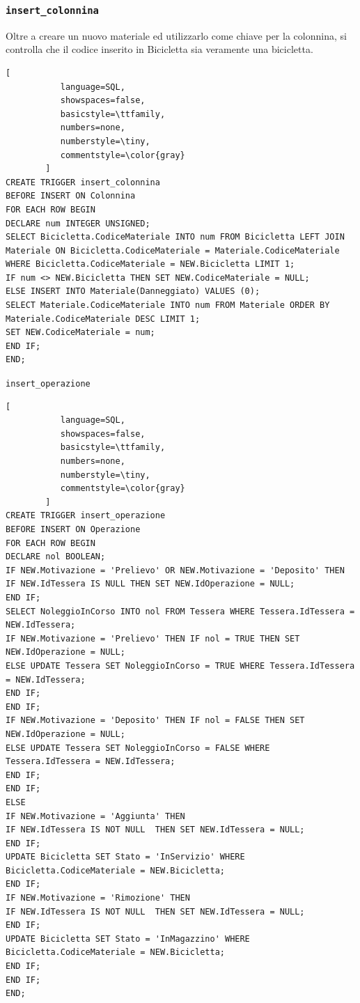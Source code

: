 \documentclass[a4paper,twoside]{article}
\begin{document}
\subsubsection{\texttt{insert\_colonnina}}
Oltre a creare un nuovo materiale ed utilizzarlo come chiave per la colonnina, si controlla che il codice inserito in Bicicletta sia veramente una bicicletta.%
\begin{lstlisting}[
           language=SQL,
           showspaces=false,
           basicstyle=\ttfamily,
           numbers=none,
           numberstyle=\tiny,
           commentstyle=\color{gray}
        ]
CREATE TRIGGER insert_colonnina
BEFORE INSERT ON Colonnina
FOR EACH ROW BEGIN
DECLARE num INTEGER UNSIGNED;
SELECT Bicicletta.CodiceMateriale INTO num FROM Bicicletta LEFT JOIN Materiale ON Bicicletta.CodiceMateriale = Materiale.CodiceMateriale WHERE Bicicletta.CodiceMateriale = NEW.Bicicletta LIMIT 1;
IF num <> NEW.Bicicletta THEN SET NEW.CodiceMateriale = NULL;
ELSE INSERT INTO Materiale(Danneggiato) VALUES (0);
SELECT Materiale.CodiceMateriale INTO num FROM Materiale ORDER BY Materiale.CodiceMateriale DESC LIMIT 1;
SET NEW.CodiceMateriale = num;
END IF;
END;
\end{lstlisting}
\texttt{insert\_operazione}
\begin{lstlisting}[
           language=SQL,
           showspaces=false,
           basicstyle=\ttfamily,
           numbers=none,
           numberstyle=\tiny,
           commentstyle=\color{gray}
        ]
CREATE TRIGGER insert_operazione
BEFORE INSERT ON Operazione
FOR EACH ROW BEGIN
DECLARE nol BOOLEAN;
IF NEW.Motivazione = 'Prelievo' OR NEW.Motivazione = 'Deposito' THEN
IF NEW.IdTessera IS NULL THEN SET NEW.IdOperazione = NULL;
END IF;
SELECT NoleggioInCorso INTO nol FROM Tessera WHERE Tessera.IdTessera = NEW.IdTessera;
IF NEW.Motivazione = 'Prelievo' THEN IF nol = TRUE THEN SET NEW.IdOperazione = NULL;
ELSE UPDATE Tessera SET NoleggioInCorso = TRUE WHERE Tessera.IdTessera = NEW.IdTessera;
END IF;
END IF;
IF NEW.Motivazione = 'Deposito' THEN IF nol = FALSE THEN SET NEW.IdOperazione = NULL;
ELSE UPDATE Tessera SET NoleggioInCorso = FALSE WHERE Tessera.IdTessera = NEW.IdTessera;
END IF;
END IF;
ELSE
IF NEW.Motivazione = 'Aggiunta' THEN
IF NEW.IdTessera IS NOT NULL  THEN SET NEW.IdTessera = NULL;
END IF;
UPDATE Bicicletta SET Stato = 'InServizio' WHERE Bicicletta.CodiceMateriale = NEW.Bicicletta;
END IF;
IF NEW.Motivazione = 'Rimozione' THEN
IF NEW.IdTessera IS NOT NULL  THEN SET NEW.IdTessera = NULL;
END IF;
UPDATE Bicicletta SET Stato = 'InMagazzino' WHERE Bicicletta.CodiceMateriale = NEW.Bicicletta;
END IF;
END IF;
END;
\end{lstlisting}
\end{document}
